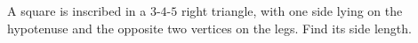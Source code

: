 A square is inscribed in a $3$-$4$-$5$ right triangle, with one side lying on the hypotenuse and the opposite two vertices on the legs. Find its side length.
